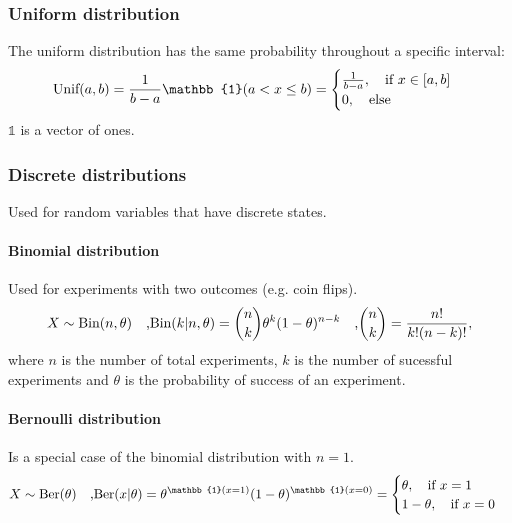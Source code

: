 \documentclass[../main.tex]{subfiles}
\begin{document}
    \subsubsection{Uniform distribution} 
            The uniform distribution has the same probability throughout a specific interval:
            \[ \text{Unif}(a,b) = \frac{1}{b-a} \mathbb{1}(a < x \leq b) = \begin{cases} 
                \frac{1}{b-a}, \text{\hspace{1em}if } x \in [ a,b ] \\
                0, \text{\hspace{1em}else}
            \end{cases}
            \]
            $\mathbb{1}$ is a vector of ones. 

    \subsubsection{Discrete distributions}
        Used for random variables that have discrete states.

        \paragraph{Binomial distribution}  Used for experiments with two outcomes (e.g. coin flips). 
                $$X \sim \text{Bin}(n, \theta ) \text{\hspace{1em},Bin}(k|n,\theta)={n \choose k} \theta^k (1-\theta)^{n-k} \text{\hspace{1em},}{n \choose k} = \frac{n!}{k!(n-k)!},$$ 
                where $n$ is the number of total experiments, $k$ is the number of sucessful experiments and $\theta$ is the probability of success of an experiment.

        \paragraph{Bernoulli distribution}  Is a special case of the binomial distribution with $n=1$. 
                $$X \sim \text{Ber}(\theta ) \text{\hspace{1em},Ber}(x | \theta)=\theta^{\mathbb{1}(x=1)} (1-\theta)^{\mathbb{1}(x=0)}= \begin{cases}
                    \theta, \hspace{1em}\text{if } x=1 \\
                    1 - \theta, \hspace{1em}\text{if } x=0
                \end{cases} $$
\end{document}
